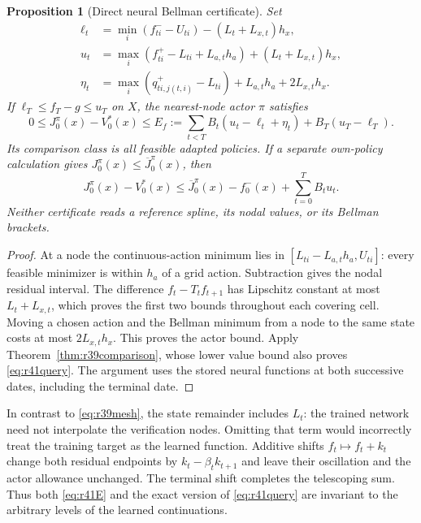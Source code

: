 \documentclass[ecta,nameyear,draft]{econsocart}
\newtheorem{proposition}[theorem]{Proposition}
\theoremstyle{definition}
\theoremstyle{remark}
\begin{document}
\begin{proposition}[Direct neural Bellman certificate]
\label{prop:r41direct}
Set
\begin{align}
 \ell_t&=\min_i(f^-_{ti}-U_{ti})-(L_t+L_{x,t})h_x,
       \label{eq:r41direct}\\
 u_t&=\max_i(f^+_{ti}-L_{ti}+L_{a,t}h_a)
                         +(L_t+L_{x,t})h_x,\nonumber\\
 \eta_t&=\max_i(q^+_{ti,j(t,i)}-L_{ti})+L_{a,t}h_a+2L_{x,t}h_x.
       \nonumber
\end{align}
If $\ell_T\leq f_T-g\leq u_T$ on $X$, the nearest-node actor $\pi$ satisfies
\begin{equation}
 0\leq J_0^\pi(x)-V_0^*(x)\leq
 E_f:=\sum_{t<T}B_t(u_t-\ell_t+\eta_t)+B_T(u_T-\ell_T).
 \label{eq:r41E}
\end{equation}
Its comparison class is all feasible adapted policies. If a separate
own-policy calculation gives $J_0^\pi(x)\leq\overline J_0^\pi(x)$, then
\begin{equation}
 J_0^\pi(x)-V_0^*(x)
 \leq\overline J_0^\pi(x)-f^-_0(x)+\sum_{t=0}^TB_tu_t.
 \label{eq:r41query}
\end{equation}
Neither certificate reads a reference spline, its nodal values, or its
Bellman brackets.
\end{proposition}
\begin{proof}
At a node the continuous-action minimum lies in
$[L_{ti}-L_{a,t}h_a,U_{ti}]$: every feasible minimizer is within $h_a$ of a
grid action. Subtraction gives the nodal residual interval. The difference
$f_t-T_tf_{t+1}$ has Lipschitz constant at most $L_t+L_{x,t}$, which proves
the first two bounds throughout each covering cell. Moving a chosen action
and the Bellman minimum from a node to the same state costs at most
$2L_{x,t}h_x$. This proves the actor bound. Apply
Theorem~\ref{thm:r39comparison}, whose lower value bound also proves
\eqref{eq:r41query}. The argument uses the stored neural functions at both
successive dates, including the terminal date.
\end{proof}

In contrast to \eqref{eq:r39mesh}, the state remainder includes $L_t$:
the trained network need not interpolate the verification nodes. Omitting
that term would incorrectly treat the training target as the learned
function. Additive shifts $f_t\mapsto f_t+k_t$ change both residual endpoints
by $k_t-\beta_tk_{t+1}$ and leave their oscillation and the actor allowance
unchanged. The terminal shift completes the telescoping sum. Thus both
\eqref{eq:r41E} and the exact version of \eqref{eq:r41query} are invariant
to the arbitrary levels of the learned continuations.
\end{document}
